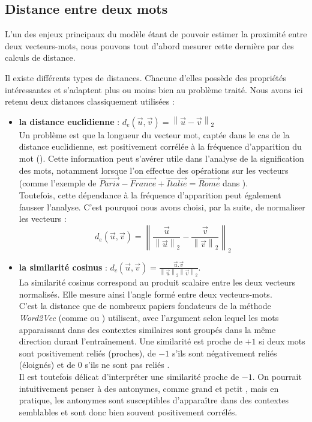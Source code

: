 \documentclass[11pt,french,french]{article}
\providecommand{\tightlist}{%
  \setlength{\parskip}{0pt}
  }
\begin{document}
\hypertarget{distance-entre-deux-mots}{%
\subsection{Distance entre deux mots}\label{distance-entre-deux-mots}}

L'un des enjeux principaux du modèle étant de pouvoir estimer la proximité entre deux vecteurs-mots, nous pouvons tout d'abord mesurer cette dernière par des calculs de distance.

Il existe différents types de distances. Chacune d'elles possède des propriétés intéressantes et s'adaptent plus ou moins bien au problème traité. Nous avons ici retenu deux distances classiquement utilisées :

\begin{itemize}
\tightlist
\item
  \textbf{la distance euclidienne} : \(d_{e}(\vec{u},\vec{v}) = \left\| \vec{u} - \vec{v} \right\|_2\)\\
  Un problème est que la longueur du vecteur mot, captée dans le cas de la distance euclidienne, est positivement corrélée à la fréquence d'apparition du mot (\cite{Schakel}). Cette information peut s'avérer utile dans l'analyse de la signification des mots, notamment lorsque l'on effectue des opérations sur les vecteurs (comme l'exemple de \(\overrightarrow{Paris} - \overrightarrow{France} + \overrightarrow{Italie} = \overrightarrow{Rome}\) dans \cite{Mikolov}).\\
  Toutefois, cette dépendance à la fréquence d'apparition peut également fausser l'analyse. C'est pourquoi nous avons choisi, par la suite, de normaliser les vecteurs :
  \[ d_{e}(\vec{u},\vec{v}) = \left\| \frac{\vec{u}}{\left\| \vec{u} \right\|_2} - \frac{\vec{v}}{\left\| \vec{v} \right\|_2}  \right\|_2\]
\item
  \textbf{la similarité cosinus} : \(d_{c}(\vec{u}, \vec{v}) = \frac{\vec{u}.\vec{v}}{\left\| \vec{u} \right\|_2 \left\| \vec{v} \right\|_2 }\).\\
  La similarité cosinus correspond au produit scalaire entre les deux vecteurs normalisés. Elle mesure ainsi l'angle formé entre deux vecteurs-mots.\\
  C'est la distance que de nombreux papiers fondateurs de la méthode \emph{Word2Vec} (comme \cite{Mikolov} ou \cite{Levy}) utilisent, avec l'argument selon lequel les mots apparaissant dans des contextes similaires sont groupés dans la même direction durant l'entraînement.
  Une similarité est proche de \(+1\) si deux mots sont positivement reliés (proches), de \(-1\) s'ils sont négativement reliés (éloignés) et de 0 s'ils ne sont pas \og reliés \fg{}.\\
  Il est toutefois délicat d'interpréter une similarité proche de \(-1\). On pourrait intuitivement penser à des antonymes, comme \og grand \fg{} et \og petit \fg{}, mais en pratique, les antonymes sont susceptibles d'apparaître dans des contextes semblables et sont donc bien souvent positivement corrélés.
\end{itemize}
\end{document}
